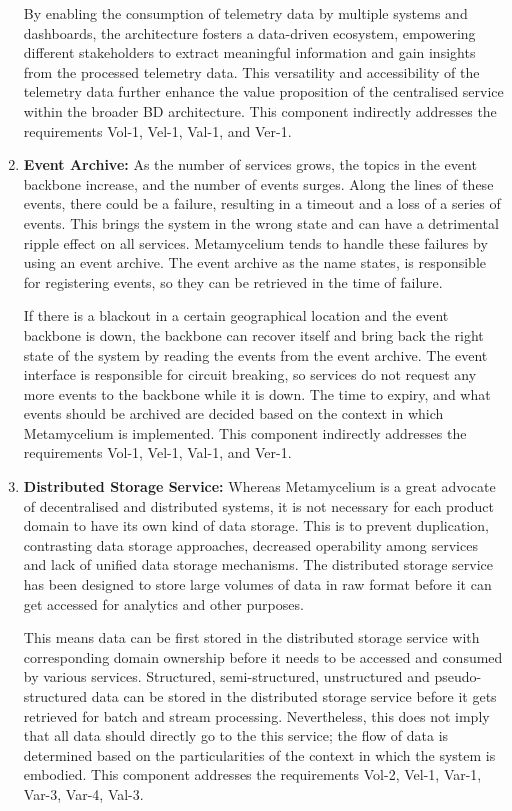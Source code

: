 \documentclass[preprint,12pt]{elsarticle}
\begin{document}
\begin{enumerate}
    By enabling the consumption of telemetry data by multiple systems and dashboards, the architecture fosters a data-driven ecosystem, empowering different stakeholders to extract meaningful information and gain insights from the processed telemetry data. This versatility and accessibility of the telemetry data further enhance the value proposition of the centralised service within the broader BD architecture. This component indirectly addresses the requirements Vol-1, Vel-1, Val-1, and Ver-1.


    \item \textbf{Event Archive:} As the number of services grows, the topics in the event backbone increase, and the number of events surges. Along the lines of these events, there could be a failure, resulting in a timeout and a loss of a series of events. This brings the system in the wrong state and can have a detrimental ripple effect on all services. Metamycelium tends to handle these failures by using an event archive. The event archive as the name states, is responsible for registering events, so they can be retrieved in the time of failure. 
    
    If there is a blackout in a certain geographical location and the event backbone is down, the backbone can recover itself and bring back the right state of the system by reading the events from the event archive. The event interface is responsible for circuit breaking, so services do not request any more events to the backbone while it is down. The time to expiry, and what events should be archived are decided based on the context in which Metamycelium is implemented. This component indirectly addresses the requirements Vol-1, Vel-1, Val-1, and Ver-1.

    \item \textbf{Distributed Storage Service:} Whereas Metamycelium is a great advocate of decentralised and distributed systems, it is not necessary for each product domain to have its own kind of data storage. This is to prevent duplication, contrasting data storage approaches, decreased operability among services and lack of unified data storage mechanisms. The distributed storage service has been designed to store large volumes of data in raw format before it can get accessed for analytics and other purposes. 
    
    This means data can be first stored in the distributed storage service with corresponding domain ownership before it needs to be accessed and consumed by various services. Structured, semi-structured, unstructured and pseudo-structured data can be stored in the distributed storage service before it gets retrieved for batch and stream processing. Nevertheless, this does not imply that all data should directly go to the this service; the flow of data is determined based on the particularities of the context in which the system is embodied. This component addresses the requirements Vol-2, Vel-1, Var-1, Var-3, Var-4, Val-3.



\end{enumerate}
\end{document}
